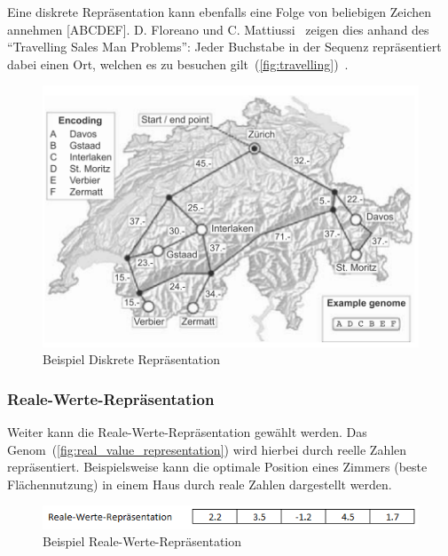         Eine diskrete Repräsentation kann ebenfalls eine Folge von beliebigen Zeichen annehmen [ABCDEF].
        D. Floreano und C. Mattiussi~\cite[S.18]{book:bioInspired} zeigen dies anhand des ``Travelling Sales Man Problems'':
        Jeder Buchstabe in der Sequenz repräsentiert dabei einen Ort,
        welchen es zu besuchen gilt~(\vref{fig:travelling})~\cite[S.18]{book:bioInspired}.

        \begin{figure}[H]
          \includegraphics[scale=0.9,center]{graphics/discret_representation}
          \caption[\protect{}, S.18]{Beispiel Diskrete Repräsentation\label{fig:travelling}}
        \end{figure}

      \subsubsection{Reale-Werte-Repräsentation\label{subsub:GeneticRepresentationReal}}

        Weiter kann die Reale-Werte-Repräsentation gewählt werden.
        Das Genom~(\vref{fig:real_value_representation}) wird hierbei durch reelle Zahlen repräsentiert.
        Beispielsweise kann die optimale Position eines Zimmers (beste Flächennutzung) in einem Haus
        durch reale Zahlen dargestellt werden.

        \begin{figure}[H]
          \includegraphics[scale=1,center]{graphics/real_value_representation}
          \caption{Beispiel Reale-Werte-Repräsentation\label{fig:real_value_representation}}
        \end{figure}

